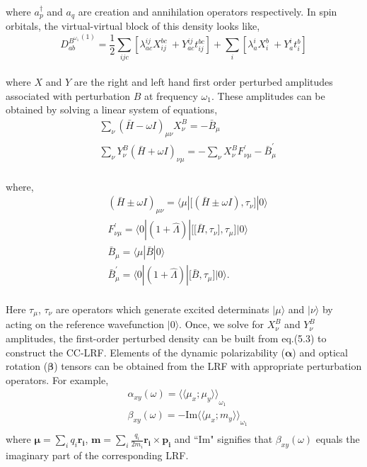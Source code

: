 \\
where $a^{\dagger}_{p}$ and $a_q$ are creation and annihilation operators respectively. 
In spin orbitals, the virtual-virtual block of this density looks like,
\\
\begin{equation}
{D^{B^{\omega_1}}_{ab}}^{(1)}= \frac{1}{2}\sum_{ijc}[\lambda^{ij}_{ac}X^{bc}_{ij} \
+ Y^{ij}_{ac}t^{bc}_{ij}] + \sum_i[\lambda^{i}_{a}X^{b}_{i}\
 + Y^{i}_{a}t^{b}_{i}] 
\end{equation}
\\
where $X$ and $Y$ are the right and left hand first order perturbed amplitudes associated with 
perturbation $B$ at frequency $\omega_1$. These amplitudes can be obtained 
by solving a linear system of equations,  
\\
\begin{equation}
\begin{split}
& \sum_\nu{(\bar{H} - \omega I)}_{\mu\nu}X_{\nu}^{B} = -\bar{B}_{\mu} \\
&\sum_\nu Y_{\nu}^{B}{(\bar{H} + \omega I)}_{\nu\mu}
= -  \sum_\nu X_{\nu}^{B} F^{'}_{\nu\mu} - \bar{B}^{'}_{\mu}
\end{split}
\end{equation}
\\
where,
\begin{equation}
\begin{split}
&{(\bar{H} \pm \omega I)}_{\mu\nu} = \langle \mu | \big[(\bar{H} \pm \omega I),\tau_\nu\big] |0\rangle\\
&F^{'}_{\nu\mu} = \langle 0|(1 + \hat{\Lambda})|\big[\big[\bar{H},\tau_\nu\big],\tau_\mu\big] |0 \rangle\\ 
&\bar{B}_{\mu} = \langle \mu|\bar{B}|0 \rangle \\
& \bar{B}^{'}_{\mu} = \langle 0|(1 + \hat{\Lambda})|\big[\bar{B},\tau_\mu\big] |0 \rangle.
\end{split}
\end{equation}
\\
Here $\tau_\mu$, $\tau_\nu$ are operators which generate excited determinats $|\mu\rangle$
and $|\nu\rangle$ by acting on the reference wavefunction $|0\rangle$. Once, we solve for 
$X_{\nu}^{B}$ and $Y_{\nu}^{B}$ amplitudes, the first-order perturbed density can be built 
from eq.(5.3) to construct the CC-LRF. Elements of the dynamic polarizability ($\bm{\alpha}$) 
and optical rotation ($\bm{\beta}$) tensors can be obtained from the LRF with appropriate 
perturbation operators. For example,
\begin{equation}
\begin{split}
& \alpha_{xy}(\omega) = {\langle\langle \mu_x;\mu_y\rangle\rangle}_{\omega_1}\\
&\beta_{xy}(\omega) = {-\text{Im} \langle\langle \mu_x;m_y\rangle\rangle}_{\omega_1} \\
\end{split}
\end{equation}
where $\bm{\mu} = \sum_i q_i \bm{r_i} $, $\bm{m} = \sum_i \frac{q_i}{2m_i} \bm{r_i} \times \bm{p_i}$
and ``Im" signifies that $\beta_{xy}(\omega)$ equals the imaginary part of the corresponding LRF.
